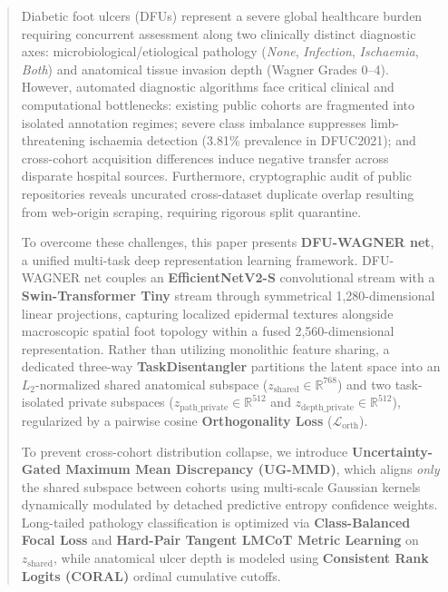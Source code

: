 \documentclass[journal]{IEEEtran}
\begin{document}
\begin{abstract}
Diabetic foot ulcers (DFUs) represent a severe global healthcare burden requiring concurrent assessment along two clinically distinct diagnostic axes: microbiological/etiological pathology (\textit{None}, \textit{Infection}, \textit{Ischaemia}, \textit{Both}) and anatomical tissue invasion depth (Wagner Grades 0--4). However, automated diagnostic algorithms face critical clinical and computational bottlenecks: existing public cohorts are fragmented into isolated annotation regimes; severe class imbalance suppresses limb-threatening ischaemia detection (3.81\% prevalence in DFUC2021); and cross-cohort acquisition differences induce negative transfer across disparate hospital sources. Furthermore, cryptographic audit of public repositories reveals uncurated cross-dataset duplicate overlap resulting from web-origin scraping, requiring rigorous split quarantine.

To overcome these challenges, this paper presents \textbf{DFU-WAGNER net}, a unified multi-task deep representation learning framework. DFU-WAGNER net couples an \textbf{EfficientNetV2-S} convolutional stream with a \textbf{Swin-Transformer Tiny} stream through symmetrical 1,280-dimensional linear projections, capturing localized epidermal textures alongside macroscopic spatial foot topology within a fused 2,560-dimensional representation. Rather than utilizing monolithic feature sharing, a dedicated three-way \textbf{TaskDisentangler} partitions the latent space into an $L_2$-normalized shared anatomical subspace ($z_{\text{shared}} \in \mathbb{R}^{768}$) and two task-isolated private subspaces ($z_{\text{path\_private}} \in \mathbb{R}^{512}$ and $z_{\text{depth\_private}} \in \mathbb{R}^{512}$), regularized by a pairwise cosine \textbf{Orthogonality Loss} ($\mathcal{L}_{\text{orth}}$). 

To prevent cross-cohort distribution collapse, we introduce \textbf{Uncertainty-Gated Maximum Mean Discrepancy (UG-MMD)}, which aligns \textit{only} the shared subspace between cohorts using multi-scale Gaussian kernels dynamically modulated by detached predictive entropy confidence weights. Long-tailed pathology classification is optimized via \textbf{Class-Balanced Focal Loss} and \textbf{Hard-Pair Tangent LMCoT Metric Learning} on $z_{\text{shared}}$, while anatomical ulcer depth is modeled using \textbf{Consistent Rank Logits (CORAL)} ordinal cumulative cutoffs. 


\end{abstract}
\end{document}
